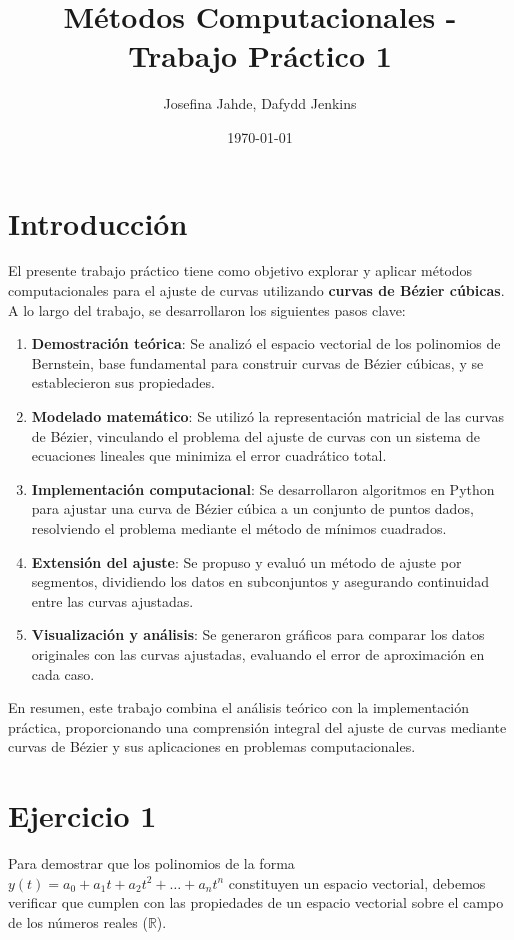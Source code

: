 \documentclass{article}
\title{Métodos Computacionales - Trabajo Práctico 1}
\author{Josefina Jahde, Dafydd Jenkins}
\date{\today}
\begin{document}
\maketitle

\section*{Introducción}

El presente trabajo práctico tiene como objetivo explorar y aplicar métodos computacionales para el ajuste de curvas utilizando \textbf{curvas de Bézier cúbicas}. A lo largo del trabajo, se desarrollaron los siguientes pasos clave:
\begin{enumerate}
    \item \textbf{Demostración teórica}: Se analizó el espacio vectorial de los polinomios de Bernstein, base fundamental para construir curvas de Bézier cúbicas, y se establecieron sus propiedades.
    \item \textbf{Modelado matemático}: Se utilizó la representación matricial de las curvas de Bézier, vinculando el problema del ajuste de curvas con un sistema de ecuaciones lineales que minimiza el error cuadrático total.
    \item \textbf{Implementación computacional}: Se desarrollaron algoritmos en Python para ajustar una curva de Bézier cúbica a un conjunto de puntos dados, resolviendo el problema mediante el método de mínimos cuadrados.
    \item \textbf{Extensión del ajuste}: Se propuso y evaluó un método de ajuste por segmentos, dividiendo los datos en subconjuntos y asegurando continuidad entre las curvas ajustadas.
    \item \textbf{Visualización y análisis}: Se generaron gráficos para comparar los datos originales con las curvas ajustadas, evaluando el error de aproximación en cada caso.
\end{enumerate}

En resumen, este trabajo combina el análisis teórico con la implementación práctica, proporcionando una comprensión integral del ajuste de curvas mediante curvas de Bézier y sus aplicaciones en problemas computacionales.

\section*{Ejercicio 1}

Para demostrar que los polinomios de la forma \( y(t) = a_0 + a_1 t + a_2 t^2 + \dots + a_n t^n \) constituyen un espacio vectorial, debemos verificar que cumplen con las propiedades de un espacio vectorial sobre el campo de los números reales (\(\mathbb{R}\)).
\end{document}
